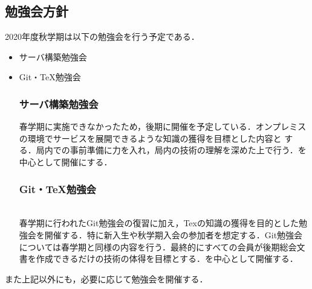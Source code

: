 \subsection*{勉強会方針}


2020年度秋学期は以下の勉強会を行う予定である．
\begin{itemize}
    \item サーバ構築勉強会
\item Git・TeX勉強会

    \subsubsection*{サーバ構築勉強会}
    春学期に実施できなかったため，後期に開催を予定している．オンプレミスの環境でサービスを展開できるような知識の獲得を目標とした内容と
する．局内での事前準備に力を入れ，局内の技術の理解を深めた上で行う．\secondGrade{}を中心として開催にする．
\subsubsection*{Git・TeX勉強会}
    \\春学期に行われたGit勉強会の復習に加え，Texの知識の獲得を目的とした勉強会を開催する．特に新入生や秋学期入会の参加者を想定する．Git勉強会については春学期と同様の内容を行う．最終的にすべての会員が後期総会文書を作成できるだけの技術の体得を目標とする．\secondgrade{}を中心として開催する．
\end{itemize}
また上記以外にも，必要に応じて勉強会を開催する．
